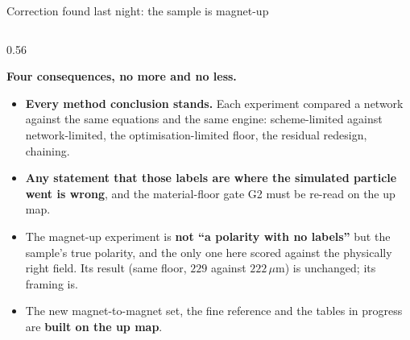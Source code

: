 \documentclass[aspectratio=169,10pt]{beamer}
\newcommand{\um}{\ensuremath{\,\mu\mathrm{m}}}
\newcommand{\hl}[1]{{\color{accent}\textbf{#1}}}
\newcommand{\bad}[1]{{\color{warm}\textbf{#1}}}
\begin{document}
\begin{frame}[shrink=25]{Correction found last night: the sample is magnet-up}
\begin{columns}[T]
\begin{column}{0.56\textwidth}
      {\footnotesize\textbf{Four consequences, no more and no less.}
      \begin{itemize}\setlength{\itemsep}{2pt}
        \item \hl{Every method conclusion stands.} Each experiment compared a
              network against the same equations and the same engine:
              scheme-limited against network-limited, the optimisation-limited
              floor, the residual redesign, chaining.
        \item \bad{Any statement that those labels are where the simulated
              particle went is wrong}, and the material-floor gate G2 must be
              re-read on the up map.
        \item The magnet-up experiment is \bad{not ``a polarity with no
              labels''} but the sample's true polarity, and the only one here
              scored against the physically right field. Its result (same
              floor, $229$ against $222\um$) is unchanged; its framing is.
        \item The new magnet-to-magnet set, the fine reference and the tables
              in progress are \hl{built on the up map}.
      \end{itemize}}
    \end{column}
  \end{columns}
\end{frame}
\end{document}
